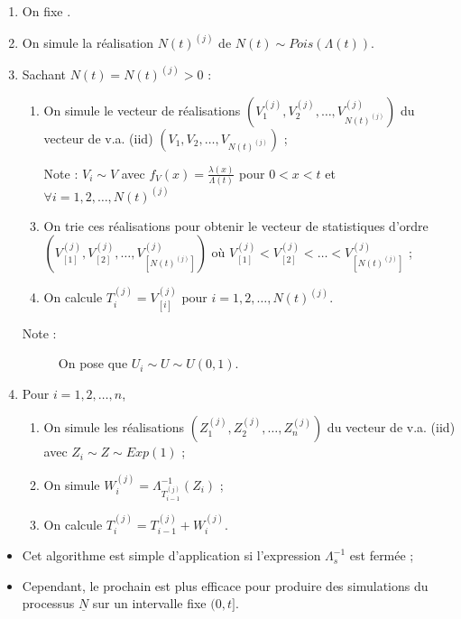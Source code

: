 \documentclass[10pt, french]{article}
\begin{document}
\begin{multicols*}{2}
\begin{algo2}
\begin{enumerate}
	\item	On fixe .
	\item	On simule la réalisation $N(t)^{(j)}$ de $N(t) \sim Pois(\Lambda(t))$.
	\item	Sachant $N(t)	=	N(t)^{(j)}	>	0$ :
		\begin{enumerate}[label = \alph*)]
		\item	On simule le vecteur de réalisations $\left( V_{1}^{(j)}, V_{2}^{(j)}, \dots, V_{N(t)^{(j)}}^{(j)}\right)$ du vecteur de v.a. (iid) $\left( V_{1}, V_{2}, \dots, V_{N(t)^{(j)}}\right)$ ;
		\item[Note :]	$V_{i} \sim V$ avec $f_{V}(x)	=	\frac{\lambda(x)}{\Lambda(t)}$ pour $0 < x < t$ et $\forall	i	=	1, 2, \dots, N(t)^{(j)}$
		\item	On trie ces réalisations pour obtenir le vecteur de statistiques d'ordre $\left( V_{[1]}^{(j)}, V_{[2]}^{(j)}, \dots, V_{[N(t)^{(j)}]}^{(j)}\right)$ où $ V_{[1]}^{(j)} < V_{[2]}^{(j)}< \dots < V_{[N(t)^{(j)}]}^{(j)}$ ;
		\item	On calcule $T_{i}^{(j)}	=	V_{[i]}^{(j)}$ pour $i	=	1, 2, \dots, N(t)^{(j)}$.
		\end{enumerate}
		\begin{description}
		\item[Note :]	On pose que $U_{i} \sim U \sim U(0, 1)$.
		\end{description}
	\item	Pour $i	=	1, 2, \dots, n$, 
		\begin{enumerate}[label = \alph*)]
		\item	On simule les réalisations $\left( Z_{1}^{(j)}, Z_{2}^{(j)}, \dots, Z_{n}^{(j)}\right)$ du vecteur de v.a. (iid) avec $Z_{i} \sim Z \sim Exp(1)$ ;
		\item	On simule $W_{i}^{(j)}	=	\Lambda^{-1}_{T_{i - 1}^{(j)}}(Z_{i})$ ;
		\item	On calcule $T_{i}^{(j)}	=	T_{i - 1}^{(j)} + W_{i}^{(j)}$.
		\end{enumerate}
\end{enumerate}

\tcbline

\begin{itemize}
	\item	Cet algorithme est simple d'application si l'expression $\Lambda_{s}^{-1}$ est fermée ;
	\item	Cependant, le prochain est plus efficace pour produire des simulations du processus $\underline{N}$ sur un intervalle fixe $(0, t]$.
\end{itemize}
\end{algo2}



\end{multicols*}
\end{document}

